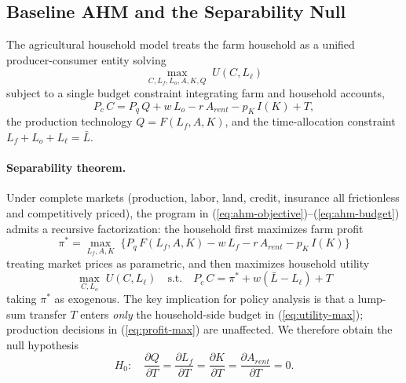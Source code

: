 \subsection{Baseline AHM and the Separability Null}
\label{sec:ahm-baseline}

The \citet{SinghSquireStrauss1986_ahm} agricultural household model treats the farm household as a unified producer-consumer entity solving
\begin{equation}
\max_{C, L_f, L_o, A, K, Q} \; U(C, L_\ell)
\label{eq:ahm-objective}
\end{equation}
subject to a single budget constraint integrating farm and household accounts,
\begin{equation}
P_c\, C = P_q\, Q + w\, L_o - r\, A_{rent} - p_K\, I(K) + T,
\label{eq:ahm-budget}
\end{equation}
the production technology $Q = F(L_f, A, K)$, and the time-allocation constraint $L_f + L_o + L_\ell = \bar L$.

\paragraph{Separability theorem.} Under complete markets (production, labor, land, credit, insurance all frictionless and competitively priced), the program in (\ref{eq:ahm-objective})--(\ref{eq:ahm-budget}) admits a recursive factorization: the household first maximizes farm profit
\begin{equation}
\pi^* = \max_{L_f, A, K} \; \{P_q\, F(L_f, A, K) - w\, L_f - r\, A_{rent} - p_K\, I(K)\}
\label{eq:profit-max}
\end{equation}
treating market prices as parametric, and then maximizes household utility
\begin{equation}
\max_{C, L_o} \; U(C, L_\ell) \quad \text{s.t.}\quad P_c\, C = \pi^* + w(\bar L - L_\ell) + T
\label{eq:utility-max}
\end{equation}
taking $\pi^*$ as exogenous. The key implication for policy analysis is that a lump-sum transfer $T$ enters \emph{only} the household-side budget in (\ref{eq:utility-max}); production decisions in (\ref{eq:profit-max}) are unaffected. We therefore obtain the null hypothesis
\begin{equation}
H_0: \quad \frac{\partial Q}{\partial T} = \frac{\partial L_f}{\partial T} = \frac{\partial K}{\partial T} = \frac{\partial A_{rent}}{\partial T} = 0.
\label{eq:null}
\end{equation}

